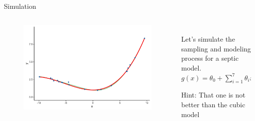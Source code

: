 \documentclass[aspectratio=169]{../latex_main/tntbeamer}  %
\begin{document}
	\begin{frame}[c]{Simulation}
	  \begin{columns}
	      \begin{column}{.6\textwidth}
	           \begin{figure}
	               \includegraphics[scale=.5]{Bild12}
	           \end{figure} 
	      \end{column}
	      
	      \begin{column}{.4\textwidth}
	      \\
	      \bigskip
	      \bigskip
	      \bigskip
	           Let’s simulate the sampling and modeling process for a \alert{septic model}.\\
	            $g(x) = \theta_0 + \sum\limits_{i=1}^7 \theta_ix^i$
	            
	            \alert{Hint}: That one is not better than the cubic model
	      \end{column}
	      
	  \end{columns}
	\end{frame}
	
\end{document}
